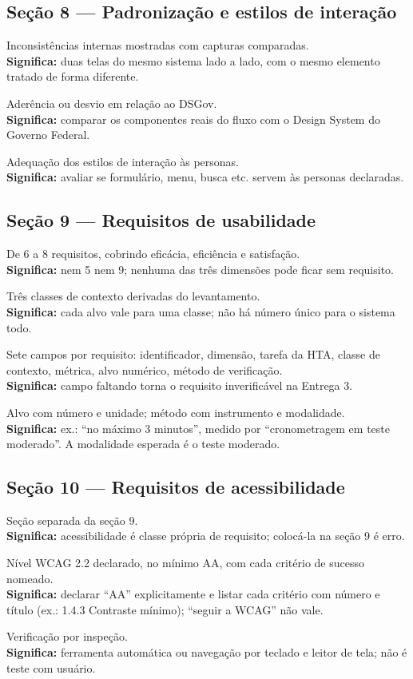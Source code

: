 \documentclass[11pt,a4paper]{article}
\newcommand{\obs}[1]{\\{\small\color{cinza}\textbf{Significa:} #1}}
\begin{document}
\subsection{Seção 8 --- Padronização e estilos de interação}
\begin{checks}
  \item Inconsistências internas mostradas com capturas comparadas.
    \obs{duas telas do mesmo sistema lado a lado, com o mesmo elemento tratado de forma diferente.}
  \item Aderência ou desvio em relação ao DSGov.
    \obs{comparar os componentes reais do fluxo com o Design System do Governo Federal.}
  \item Adequação dos estilos de interação às personas.
    \obs{avaliar se formulário, menu, busca etc. servem às personas declaradas.}
\end{checks}

\subsection{Seção 9 --- Requisitos de usabilidade}
\begin{checks}
  \item De 6 a 8 requisitos, cobrindo eficácia, eficiência e satisfação.
    \obs{nem 5 nem 9; nenhuma das três dimensões pode ficar sem requisito.}
  \item Três classes de contexto derivadas do levantamento.
    \obs{cada alvo vale para uma classe; não há número único para o sistema todo.}
  \item Sete campos por requisito: identificador, dimensão, tarefa da HTA, classe de contexto, métrica, alvo numérico, método de verificação.
    \obs{campo faltando torna o requisito inverificável na Entrega 3.}
  \item Alvo com número e unidade; método com instrumento e modalidade.
    \obs{ex.: ``no máximo 3 minutos'', medido por ``cronometragem em teste moderado''. A modalidade esperada é o teste moderado.}
\end{checks}

\subsection{Seção 10 --- Requisitos de acessibilidade}
\begin{checks}
  \item Seção separada da seção 9.
    \obs{acessibilidade é classe própria de requisito; colocá-la na seção 9 é erro.}
  \item Nível WCAG 2.2 declarado, no mínimo AA, com cada critério de sucesso nomeado.
    \obs{declarar ``AA'' explicitamente e listar cada critério com número e título (ex.: 1.4.3 Contraste mínimo); ``seguir a WCAG'' não vale.}
  \item Verificação por inspeção.
    \obs{ferramenta automática ou navegação por teclado e leitor de tela; não é teste com usuário.}
\end{checks}
\end{document}
